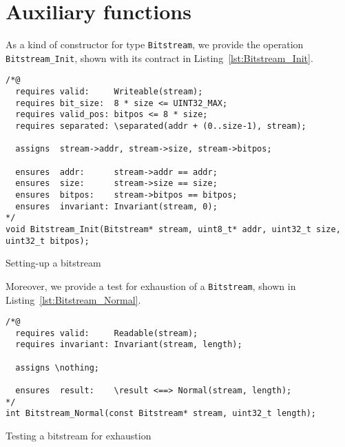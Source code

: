 \section{Auxiliary  functions}
\label{sec:bitstream-aux}


As a kind of constructor for type
\lstinline{Bitstream}, we provide the operation \lstinline{Bitstream_Init},
shown with its contract in Listing~\ref{lst:Bitstream_Init}.




\begin{listing}[hbt]
\begin{minipage}{0.99\textwidth}
\begin{lstlisting}[style=acsl-block]
/*@
  requires valid:     Writeable(stream);
  requires bit_size:  8 * size <= UINT32_MAX;
  requires valid_pos: bitpos <= 8 * size;
  requires separated: \separated(addr + (0..size-1), stream);

  assigns  stream->addr, stream->size, stream->bitpos;

  ensures  addr:      stream->addr == addr;
  ensures  size:      stream->size == size;
  ensures  bitpos:    stream->bitpos == bitpos;
  ensures  invariant: Invariant(stream, 0);
*/
void Bitstream_Init(Bitstream* stream, uint8_t* addr, uint32_t size, uint32_t bitpos);
\end{lstlisting}
\end{minipage}
\caption{\label{lst:Bitstream_Init}Setting-up a bitstream}
\end{listing}

\FloatBarrier

Moreover, we provide a test for exhaustion of a \lstinline{Bitstream},
shown in Listing~\ref{lst:Bitstream_Normal}.


\begin{listing}[hbt]
\begin{minipage}{0.99\textwidth}
\begin{lstlisting}[style=acsl-block]
/*@
  requires valid:     Readable(stream);
  requires invariant: Invariant(stream, length);

  assigns \nothing;

  ensures  result:    \result <==> Normal(stream, length);
*/
int Bitstream_Normal(const Bitstream* stream, uint32_t length);
\end{lstlisting}
\end{minipage}
\caption{\label{lst:Bitstream_Normal}Testing a bitstream for exhaustion}
\end{listing}



